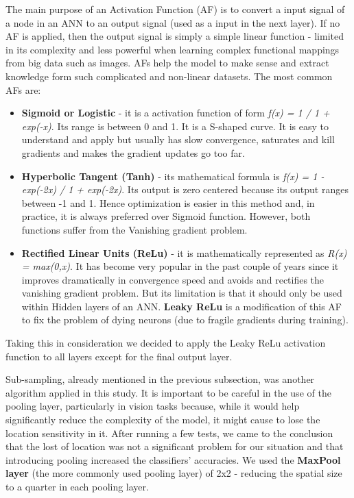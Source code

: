 \documentclass[10pt]{IEEEtran}
\begin{document}
The main purpose of an Activation Function (AF) is to convert a input signal of a node in an ANN to an output signal (used as a input in the next layer).
If no AF is applied, then the output signal is simply a simple linear function - limited in its complexity and less powerful when learning complex functional mappings from big data such as images.
AFs help the model to make sense and extract knowledge form such complicated and non-linear datasets.
\newpage{}
The most common AFs are: 
\begin{itemize}
\item \textbf{Sigmoid or Logistic} - it is a activation function of form \textit{f(x) = 1 / 1 + exp(-x)}. Its range is between 0 and 1. It is a S-shaped curve. It is easy to understand and apply but usually has slow convergence, saturates and kill gradients and makes the gradient updates go too far.
\item \textbf{Hyperbolic Tangent (Tanh)} - its mathematical formula is \textit{f(x) = 1 -  exp(-2x) / 1 + exp(-2x)}. Its output is zero centered because its output ranges between -1 and 1. Hence optimization is easier in this method and, in practice, it is always preferred over Sigmoid function. However, both functions suffer from the Vanishing gradient problem.
\item \textbf{Rectified Linear Units (ReLu)} - it is mathematically represented as \textit{R(x) = max(0,x)}. It has become very popular in the past couple of years since it improves dramatically in convergence speed and avoids and rectifies the vanishing gradient problem. But its limitation is that it should only be used within Hidden layers of an ANN. \textbf{Leaky ReLu} is a modification of this AF to fix the problem of dying neurons (due to fragile gradients during training).
\end{itemize}
Taking this in consideration we decided to apply the Leaky ReLu activation function to all layers except for the final output layer. 

Sub-sampling, already mentioned in the previous subsection, was another algorithm applied in this study.
It is important to be careful in the use of the pooling layer, particularly in vision tasks because, while it would help significantly reduce the complexity of the model, it might cause to lose the location sensitivity in it.
After running a few tests, we came to the conclusion that the lost of location was not a significant problem for our situation and that introducing pooling increased the classifiers' accuracies.
We used the \textbf{MaxPool layer} (the more commonly used pooling layer) of 2x2 - reducing the spatial size to a quarter in each pooling layer.
\end{document}
